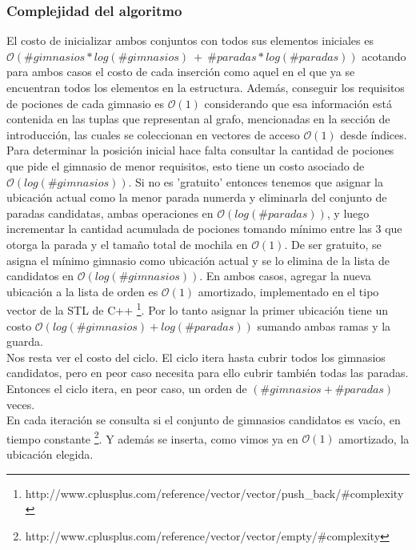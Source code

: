 \subsubsection{Complejidad del algoritmo}
    El costo de inicializar ambos conjuntos con todos sus elementos iniciales es $\mathcal{O}(\#gimnasios * log(\#gimnasios)\ +\ \#paradas*log(\#paradas))$ acotando para ambos casos el costo de cada inserción como aquel en el que ya se encuentran todos los elementos en la estructura. Además, conseguir los requisitos de pociones de cada gimnasio es $\mathcal{O}(1)$ considerando que esa información está contenida en las tuplas que representan al grafo, mencionadas en la sección de introducción, las cuales se coleccionan en vectores de acceso $\mathcal{O}(1)$ desde índices.
    \\

    Para determinar la posición inicial hace falta consultar la cantidad de pociones que pide el gimnasio de menor requisitos, esto tiene un costo asociado de $\mathcal{O}(log(\#gimnasios))$. Si no es 'gratuito' entonces tenemos que asignar la ubicación actual como la menor parada numerda y eliminarla del conjunto de paradas candidatas, ambas operaciones en $\mathcal{O}(log(\#paradas))$, y luego incrementar la cantidad acumulada de pociones tomando mínimo entre las 3 que otorga la parada y el tamaño total de mochila en $\mathcal{O}(1)$. De ser gratuito, se asigna el mínimo gimnasio como ubicación actual y se lo elimina de la lista de candidatos en $\mathcal{O}(log(\#gimnasios))$. En ambos casos, agregar la nueva ubicación a la lista de orden es $\mathcal{O}(1)$ amortizado, implementado en el tipo vector de la STL de C++ \footnote{http://www.cplusplus.com/reference/vector/vector/push_back/\#complexity}. Por lo tanto asignar la primer ubicación tiene un costo $\mathcal{O}(log(\#gimnasios)+log(\#paradas))$ sumando ambas ramas y la guarda.
    \\

    Nos resta ver el costo del ciclo. El ciclo itera hasta cubrir todos los gimnasios candidatos, pero en peor caso necesita para ello cubrir también todas las paradas. Entonces el ciclo itera, en peor caso, un orden de $(\#gimnasios+\#paradas)$ veces.
    \\

    En cada iteración se consulta si el conjunto de gimnasios candidatos es vacío, en tiempo constante \footnote{http://www.cplusplus.com/reference/vector/vector/empty/\#complexity}. Y además se inserta, como vimos ya en $\mathcal{O}(1)$ amortizado, la ubicación elegida.
    \\

